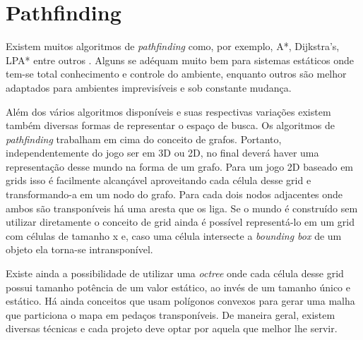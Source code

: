 \documentclass[12pt, 
openright, 
oneside, 
a4paper,    
brazil]{facom-ufu-abntex2}
\begin{document}


\section{Pathfinding}
Existem muitos algoritmos de \textit{pathfinding} como, por exemplo, A*, Dijkstra's, LPA* entre outros . Alguns se adéquam muito bem para sistemas estáticos onde tem-se total conhecimento e controle do ambiente, enquanto outros são melhor adaptados para ambientes imprevisíveis e sob constante mudança.

Além dos vários algoritmos disponíveis e suas respectivas variações existem também diversas formas de representar o espaço de busca. Os algoritmos de \textit{pathfinding} trabalham em cima do conceito de grafos. Portanto, independentemente do jogo ser em 3D ou 2D, no final deverá haver uma representação desse mundo na forma de um grafo. Para um jogo 2D baseado em grids isso é facilmente alcançável aproveitando cada célula desse grid e transformando-a em um nodo do grafo. Para cada dois nodos adjacentes onde ambos são transponíveis há uma aresta que os liga. Se o mundo é construído sem utilizar diretamente o conceito de grid ainda é possível representá-lo em um grid com células de tamanho x e, caso uma célula intersecte a \textit{bounding box} de um objeto
ela torna-se intransponível.

Existe ainda a possibilidade de utilizar uma \textit{octree} onde cada célula desse grid possui tamanho potência de um valor estático, ao invés de um tamanho único e estático. Há ainda conceitos que usam polígonos convexos para gerar uma malha que particiona o mapa em pedaços transponíveis. De maneira geral, existem diversas técnicas e cada projeto deve optar por aquela que melhor lhe servir.
\end{document}
